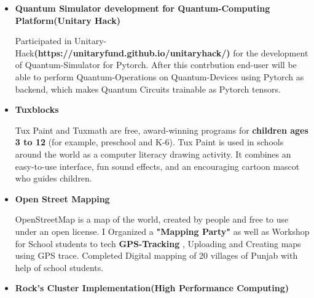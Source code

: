 \documentclass[11pt,a4paper,sans]{moderncv}        %
\begin{document}
{\begin{itemize}
\vspace{3pt}

Development of Container-Orchestration for \href{https://github.com/PennyLaneAI}{Pennylane} to support
multiple Quantum-interfaces with single space and one click installation for CPU and GPU devices.

\vspace{6pt}

\item \textbf{Quantum Simulator development for Quantum-Computing Platform(Unitary Hack) }
\vspace{3pt}

Participated in Unitary-Hack\textbf{(https://unitaryfund.github.io/unitaryhack/)} for the development of
Quantum-Simulator for Pytorch. After this contrbution end-user will be able to perform Quantum-Operations
on Quantum-Devices using Pytorch as backend, which makes Quantum Circuits trainable as Pytorch tensors.

\vspace{6pt}

\item \textbf{Tuxblocks}
\vspace{3pt}

Tux Paint and Tuxmath are free,
award-winning programs for \textbf{children ages 3 to 12} (for example, preschool and K-6).
Tux Paint is used in schools around the world as a computer literacy drawing activity.
It combines an easy-to-use interface, fun sound effects,
and an encouraging cartoon mascot who guides children.

\vspace{6pt}

\item \textbf{Open Street Mapping}

\vspace{3pt}

OpenStreetMap is a map of the world, created by people and free to use under an open license.
I Organized a \textbf{"Mapping Party"} as well as Workshop for School students to tech \textbf{GPS-Tracking} ,
Uploading and Creating maps using GPS trace.
Completed Digital mapping of 20 villages of Punjab with help of school students.

\vspace{6pt}

\item \textbf{Rock's Cluster Implementation(High Performance Computing)}

\vspace{3pt}


\end{itemize}}
\end{document}
